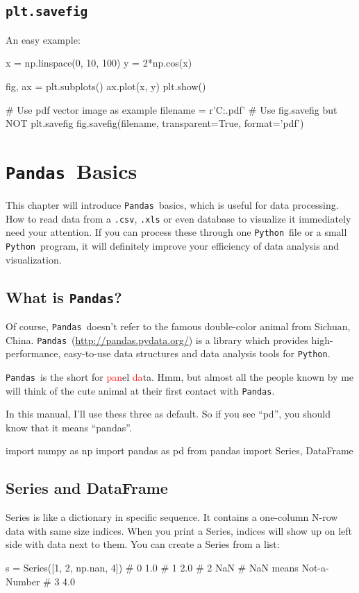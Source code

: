 \documentclass{report}
\newcommand{\pkg}[1]{\texttt{#1}}
\newcommand{\Py}{\pkg{Python}}
\newcommand{\pd}{\pkg{Pandas}}
\newcommand{\RED}[1]{\textcolor{red}{#1}}
\newcommand{\nextblock}{\vspace{2ex}}
\begin{document}
\section{\texttt{plt.savefig}}
An easy example:
\begin{py}
x = np.linspace(0, 10, 100)
y = 2*np.cos(x)

fig, ax = plt.subplots()
ax.plot(x, y)
plt.show()

# Use pdf vector image as example
filename = r'C:\test.pdf'
# Use fig.savefig but NOT plt.savefig
fig.savefig(filename, transparent=True, format='pdf')
\end{py}

\chapter{\pd\ Basics}
This chapter\cite{mckinney2012py} will introduce \pd\ basics, which is useful for data processing. How to read data from a \texttt{.csv}, \texttt{.xls} or even database to visualize it immediately need your attention. If you can process these through one \Py\ file or a small \Py\ program, it will definitely improve your efficiency of data analysis and visualization. 

\section{What is \pd ?}
Of course, \pd\ doesn't refer to the famous double-color animal from Sichuan, China. \pd\ (\url{http://pandas.pydata.org/}) is a library which provides high-performance, easy-to-use data structures and data analysis tools for \Py .

\pd\ is the short for \RED{pan}el \RED{da}ta. Hmm, but almost all the people known by me will think of the cute animal at their first contact with \pd . 

\nextblock In this manual, I'll use thess three as default. So if you see ``pd'', you should know that it means ``pandas''. 
\begin{py}
import numpy as np
import pandas as pd
from pandas import Series, DataFrame
\end{py}

\section{Series and DataFrame}
Series is like a dictionary in specific sequence. It contains a one-column N-row data with same size indices. When you print a Series, indices will show up on left side with data next to them. You can create a Series from a list: 
\begin{py}
s = Series([1, 2, np.nan, 4])
# 0    1.0
# 1    2.0
# 2    NaN # NaN means Not-a-Number
# 3    4.0
\end{py}
\end{document}
